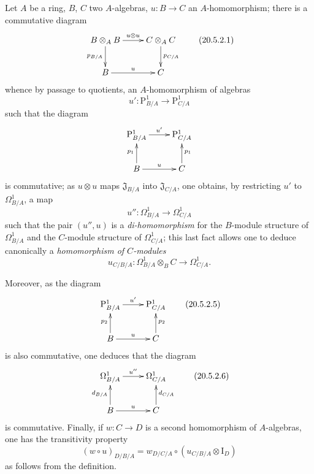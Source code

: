 \begin{env}[20.5.2]
\label{0.20.5.2}
Let $A$ be a ring, $B$, $C$ two $A$-algebras, $u:B\to C$ an $A$-homomorphism; there is a commutative diagram
\[
\xymatrix{
  B\otimes_A B \ar[r]^{u\otimes u} \ar[d]_{p_{B/A}} & C\otimes_A C \ar[d]^{p_{C/A}} \\
  B \ar[r]^u & C
}
\tag{20.5.2.1}
  \label{0.20.5.2.1}
\]
whence by passage to quotients, an $A$-homomorphism of algebras
\begin{equation}
\tag{20.5.2.2}
  \label{0.20.5.2.2}
  u':\mathrm{P}^1_{B/A}\to\mathrm{P}^1_{C/A}
\end{equation}
such that the diagram
\[
\xymatrix{
  \mathrm{P}^1_{B/A} \ar[r]^{u'} & \mathrm{P}^1_{C/A} \\
  B \ar[u]^{p_1} \ar[r]^u & C \ar[u]_{p_1}
}
\]
is commutative; as $u\otimes u$ maps $\mathfrak{J}_{B/A}$ into $\mathfrak{J}_{C/A}$, one obtains, by restricting $u'$ to $\Omega^1_{B/A}$, a map
\begin{equation}
\tag{20.5.2.3}
  \label{0.20.5.2.3}
  u'':\Omega^1_{B/A}\to\Omega^1_{C/A}
\end{equation}
such that the pair $(u'',u)$ is a \emph{di-homomorphism} for the $B$-module structure of $\Omega^1_{B/A}$ and the $C$-module structure of $\Omega^1_{C/A}$; this last fact allows one to deduce canonically a \emph{homomorphism of $C$-modules}
\begin{equation}
\tag{20.5.2.4}
  \label{0.20.5.2.4}
  u_{C/B/A}:\Omega^1_{B/A}\otimes_B C\to\Omega^1_{C/A}.
\end{equation}

Moreover, as the diagram
\[
\xymatrix{
  \mathrm{P}^1_{B/A} \ar[r]^{u'} & \mathrm{P}^1_{C/A} \\
  B \ar[u]^{p_2} \ar[r]^u & C \ar[u]_{p_2}
}
\tag{20.5.2.5}
  \label{0.20.5.2.5}
\]
is also commutative, one deduces that the diagram
\[
\xymatrix{
  \Omega^1_{B/A} \ar[r]^{u''} & \Omega^1_{C/A} \\
  B \ar[u]^{d_{B/A}} \ar[r]^u & C \ar[u]_{d_{C/A}}
}
\tag{20.5.2.6}
  \label{0.20.5.2.6}
\]
is commutative.
Finally, if $w:C\to D$ is a second homomorphism of $A$-algebras, one has the transitivity property
\begin{equation}
\tag{20.5.2.7}
  \label{0.20.5.2.7}
  (w\circ u)_{D/B/A} = w_{D/C/A}\circ(u_{C/B/A}\otimes\mathrm{I}_D)
\end{equation}
as follows from the definition.
\end{env}

